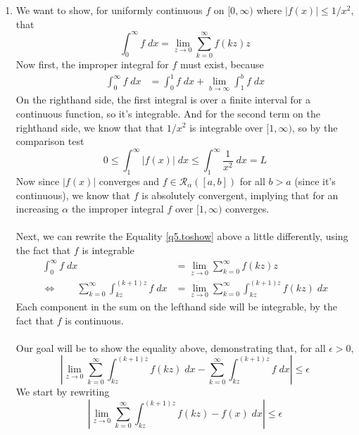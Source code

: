 \documentclass[12pt]{article}
\theoremstyle{plain}
\theoremstyle{definition}
\theoremstyle{remark}
\begin{document}
\begin{enumerate}
\begin{enumerate}
\item 
We want to show, for uniformly continuous $f$ on $[0,\infty)$ where $|f(x)| \leq 1/x^2$, that 
\begin{equation}
    \label{q5.toshow}
    \int^\infty_0 f \; dx = \lim_{z\rightarrow 0} \sum^\infty_{k=0} f(kz) z
\end{equation}
Now first, the improper integral for $f$ must exist, because 
\begin{align*}
    \int^\infty_0 f \; dx &= \int^1_0 f \; dx + \lim_{b\rightarrow\infty} \int^b_1 f \; dx
\end{align*}
On the righthand side, the first integral is over a finite interval for a continuous function, so it's integrable. And for the second term on the righthand side, we know that that $1/x^2$ is integrable over $[1,\infty)$, so by the comparison test
    \[ 0 \leq \int^\infty_1 |f(x)| \;dx \leq \int^\infty_1 \frac{1}{x^2} \;dx = L \]
Now since $|f(x)|$ converges and $f \in \mathscr{R}_\alpha([a,b])$ for all $b>a$ (since it's continuous), we know that $f$ is absolutely convergent, implying that for an increasing $\alpha$ the improper integral $f$ over $[1,\infty)$ converges.
\\
\\
Next, we can rewrite the Equality \ref{q5.toshow} above a little differently, using the fact that $f$ is integrable 
\begin{align*}
    \int^\infty_0 f \; dx &= \lim_{z\rightarrow 0} \sum^\infty_{k=0} f(kz) z \\
    \Leftrightarrow \qquad 
    \sum_{k=0}^\infty \int^{(k+1)z}_{kz} f \; dx &= \lim_{z\rightarrow 0} 
        \sum^\infty_{k=0} \int^{(k+1)z}_{kz} f(kz) \; dx 
\end{align*}
Each component in the sum on the lefthand side will be integrable, by the fact that $f$ is continuous.
\\
\\
Our goal will be to show the equality above, demonstrating that, for all $\epsilon>0$,
\begin{equation}
    \left\lvert\lim_{z\rightarrow 0} 
        \sum^\infty_{k=0} \int^{(k+1)z}_{kz} f(kz) \; dx 
        -\sum_{k=0}^\infty \int^{(k+1)z}_{kz} f \; dx \right\rvert \leq \epsilon
\end{equation}
We start by rewriting
\begin{equation}
    \label{q6.equiv}
    \left\lvert\lim_{z\rightarrow 0} 
        \sum^\infty_{k=0} \int^{(k+1)z}_{kz} f(kz) - f(x) \; dx 
        \right\rvert \leq \epsilon 
\end{equation}

\end{enumerate}
\end{enumerate}
\end{document}
